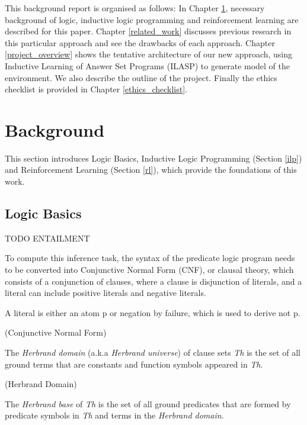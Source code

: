 \documentclass[12pt,twoside]{report}
\begin{document}
This background report is organised as follows: In Chapter \ref{background}, necessary background of logic, inductive logic programming and reinforcement learning are described for this paper. Chapter \ref{related_work} discusses previous research in this particular approach and see the drawbacks of each approach. Chapter \ref{project_overview} shows the tentative architecture of our new approach, using Inductive Learning of Answer Set Programs (ILASP) to generate model of the environment. We also describe the outline of the project. Finally the ethics checklist is provided in Chapter \ref{ethics_checklist}.

\chapter{Background}
\label{background}

This section introduces Logic Basics, Inductive Logic Programming (Section \ref{ilp}) and Reinforcement Learning (Section \ref{rl}), which provide the foundations of this work.

\section{Logic Basics}

TODO ENTAILMENT

To compute this inference task, the syntax of the predicate logic program needs to be converted into Conjunctive Normal Form (CNF), or clausal theory, which consists of a conjunction of clauses, where a clause is disjunction of literals, and a literal can include positive literals and negative literals.

A literal is either an atom p or negation by failure, which is used to derive not p.

\begin{examp} (Conjunctive Normal Form)

\end{examp}

The \textit{Herbrand domain} (a.k.a \textit{Herbrand universe}) of clause sets \textit{Th} is the set of all ground terms that are constants and function symbols appeared in \textit{Th}.

\begin{examp} (Herbrand Domain)

\end{examp}

The \textit{Herbrand base} of \textit{Th} is the set of all ground predicates that are formed by predicate symbols in \textit{Th} and terms in the \textit{Herbrand domain}.
\end{document}
